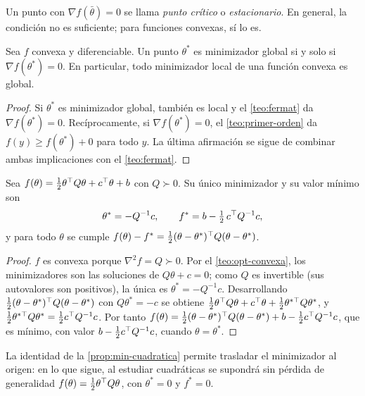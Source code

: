 Un punto con $\nabla f(\bar\theta)=0$ se llama \emph{punto crítico} o \emph{estacionario}. En general, la condición no es suficiente; para funciones convexas, sí lo es.

\begin{teorema}\label{teo:opt-convexa}
Sea $f$ convexa y diferenciable. Un punto $\theta^{\ast}$ es minimizador global si y solo si $\nabla f(\theta^{\ast})=0$. En particular, todo minimizador local de una función convexa es global.
\end{teorema}

\begin{proof}
Si $\theta^{\ast}$ es minimizador global, también es local y el \cref{teo:fermat} da $\nabla f(\theta^{\ast})=0$. Recíprocamente, si $\nabla f(\theta^{\ast})=0$, el \cref{teo:primer-orden} da $f(y)\ge f(\theta^{\ast})+0$ para todo $y$. La última afirmación se sigue de combinar ambas implicaciones con el \cref{teo:fermat}.
\end{proof}

\begin{proposicion}\label{prop:min-cuadratica}
Sea $f(\theta)=\tfrac12\theta^{\top} Q\theta+c^{\top}\theta+b$ con $Q\succ 0$. Su único minimizador y su valor mínimo son
\[
\theta^{\ast}=-Q^{-1}c,\qquad f^{\ast}=b-\tfrac12\,c^{\top} Q^{-1}c,
\]
y para todo $\theta$ se cumple $f(\theta)-f^{\ast}=\tfrac12(\theta-\theta^{\ast})^{\top} Q(\theta-\theta^{\ast})$.
\end{proposicion}

\begin{proof}
$f$ es convexa porque $\nabla^{2}f=Q\succ 0$. Por el \cref{teo:opt-convexa}, los minimizadores son las soluciones de $Q\theta+c=0$; como $Q$ es invertible (sus autovalores son positivos), la única es $\theta^{\ast}=-Q^{-1}c$. Desarrollando $\tfrac12(\theta-\theta^{\ast})^{\top} Q(\theta-\theta^{\ast})$ con $Q\theta^{\ast}=-c$ se obtiene $\tfrac12\theta^{\top} Q\theta+c^{\top}\theta+\tfrac12\theta^{\ast\top}Q\theta^{\ast}$, y $\tfrac12\theta^{\ast\top}Q\theta^{\ast}=\tfrac12c^{\top} Q^{-1}c$. Por tanto $f(\theta)=\tfrac12(\theta-\theta^{\ast})^{\top} Q(\theta-\theta^{\ast})+b-\tfrac12c^{\top} Q^{-1}c$, que es mínimo, con valor $b-\tfrac12c^{\top} Q^{-1}c$, cuando $\theta=\theta^{\ast}$.
\end{proof}

La identidad de la \cref{prop:min-cuadratica} permite trasladar el minimizador al origen: en lo que sigue, al estudiar cuadráticas se supondrá sin pérdida de generalidad $f(\theta)=\tfrac12\theta^{\top} Q\theta$, con $\theta^{\ast}=0$ y $f^{\ast}=0$.

